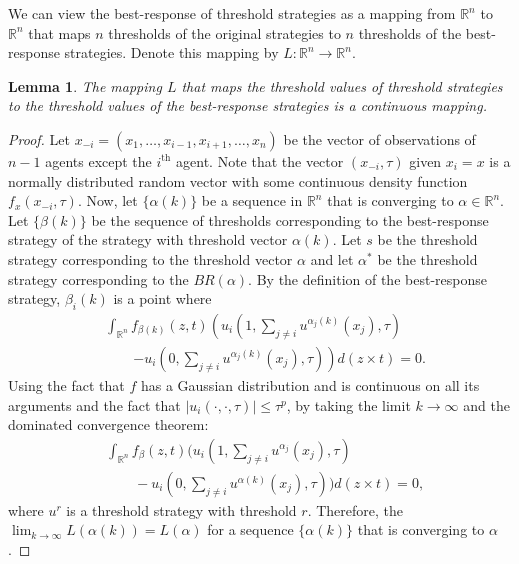 \documentclass[defaultstyle,12pt]{thesis}
\newtheorem{lemma}{Lemma}
\newcommand{\R}{\mathbb{R}}    %
\begin{document}
We can view the best-response of threshold strategies as a mapping from $\R^n$ to $\R^n$ that maps $n$ thresholds of the original strategies to $n$ thresholds of the best-response strategies. Denote this mapping by $L:\R^n\to\R^n$.
\begin{lemma}\label{lemma:continuous}
The mapping $L$ that maps the threshold values of threshold strategies to the threshold values of the best-response strategies is a continuous mapping. 
\end{lemma}


\begin{proof}
Let $x_{-i}=(x_1,\ldots,x_{i-1},x_{i+1},\ldots,x_n)$ be the vector of observations of $n-1$ agents except the $i^{\text{th}}$ agent. Note that the vector $(x_{-i},\tau)$ given $x_i=x$ is a normally distributed random vector with some continuous density function $f_{x}(x_{-i},\tau)$. Now, let $\{\alpha(k)\}$ be a sequence in $\R^n$ that is converging to $\alpha\in\R^n$. Let $\{\beta(k)\}$ be the sequence of thresholds corresponding to the best-response strategy of the strategy with threshold vector $\alpha(k)$. Let $s$ be the threshold strategy corresponding to the threshold vector $\alpha$ and let $\alpha^*$ be the threshold strategy corresponding to the $BR(\alpha)$. By the definition of the best-response strategy, $\beta_i(k)$ is a point where 
\begin{align}
&\int_{\R^{n}}f_{\beta(k)}(z,t)\left(u_i(1,\sum_{j\not=i}u^{\alpha_j(k)}(x_j),\tau)\right.\\
&\qquad\left.-u_i(0,\sum_{j\not=i}u^{\alpha_j(k)}(x_j),\tau)\right)d(z\times t)=0.
\end{align}
Using the fact that $f$ has a Gaussian distribution and is continuous on all its arguments and the fact that $|u_i(\cdot,\cdot,\tau)|\leq \tau^p$, by taking the limit $k\to\infty$ and the dominated convergence theorem:
\begin{align}
&\int_{\R^{n}}f_{\beta}(z,t)(u_i(1,\sum_{j\not=i}u^{\alpha_j}(x_j),\tau)\\ 
&\qquad-u_i(0,\sum_{j\not=i}u^{\alpha(k)}(x_j),\tau))d(z\times t)=0,
\end{align}
where $u^{r}$ is a threshold strategy with threshold $r$. Therefore, the $\lim_{k\to\infty}L(\alpha(k))=L(\alpha)$ for a sequence $\{\alpha(k)\}$ that is converging to $\alpha$.
\end{proof}
\end{document}
